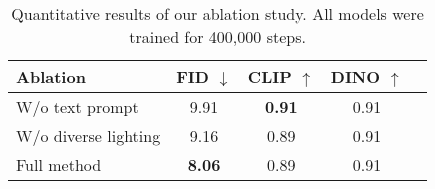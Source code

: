 \begin{table}[ht]
    \centering
    \caption{Quantitative results of our ablation study. All models were trained for 400,000 steps.}
    \label{tab:ablation}
    \begin{tabular}{@{}lcccc@{}} %
        \toprule
        \textbf{Ablation} & \textbf{FID $\downarrow$} & \textbf{CLIP $\uparrow$} & \textbf{DINO $\uparrow$}  \\ 
        \midrule
            W/o text prompt & 9.91 & \textbf{0.91} &0.91&  \\
        W/o diverse lighting  & 9.16 & 0.89 & 0.91 &  \\
        Full method & \textbf{8.06} & 0.89 & 0.91 \\

        \bottomrule
    \end{tabular}
    \vspace{-16pt}
\end{table}
